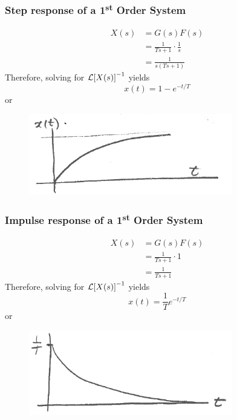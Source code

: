 \documentclass[12pt,letter]{article}
\begin{document}
\subsubsection{Step response of a 1\textsuperscript{st} Order System}

\begin{align}
X(s) &= G(s)F(s) \\
&= \frac{1}{Ts+1} \cdot \frac{1}{s} \nonumber \\
&= \frac{1}{s(Ts+1)}
\end{align}
Therefore, solving for $\mathcal{L}{\left[X(s)\right]}^{-1}$ yields
\begin{equation}
x(t) = 1-e^{-t/T}
\end{equation}
or
\begin{figure}[H]
	\centering
	\includegraphics[width=3.5in]{../figures/x_t_time_response}
\end{figure}


\subsubsection{Impulse response of a 1\textsuperscript{st} Order System}


\begin{align}
X(s) &= G(s)F(s) \\
&= \frac{1}{Ts+1} \cdot 1 \nonumber \\
&= \frac{1}{Ts+1}
\end{align}
Therefore, solving for $\mathcal{L}{\left[X(s)\right]}^{-1}$ yields
\begin{equation}
x(t) = \frac{1}{T}e^{-t/T}
\end{equation}
or
\begin{figure}[H]
	\centering
	\includegraphics[width=3.5in]{../figures/x_t_impulse_time_response}
\end{figure}
\end{document}
